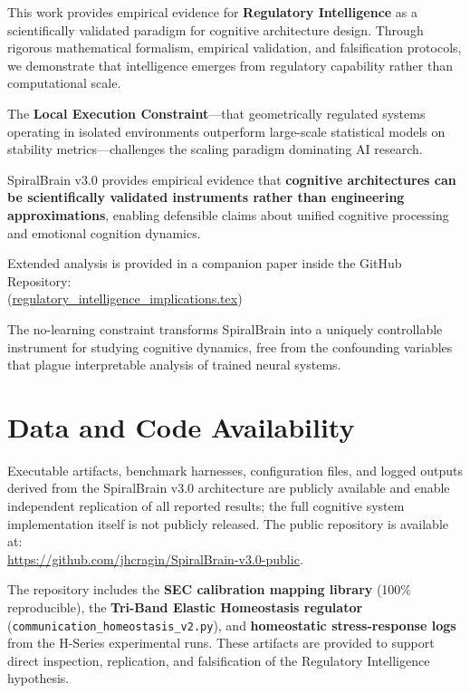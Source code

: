 \documentclass[12pt,a4paper]{report}
\begin{document}
This work provides empirical evidence for \textbf{Regulatory Intelligence} as a scientifically validated paradigm for cognitive architecture design. Through rigorous mathematical formalism, empirical validation, and falsification protocols, we demonstrate that intelligence emerges from regulatory capability rather than computational scale.

The \textbf{Local Execution Constraint}—that geometrically regulated systems operating in isolated environments outperform large-scale statistical models on stability metrics—challenges the scaling paradigm dominating AI research.

SpiralBrain v3.0 provides empirical evidence that \textbf{cognitive architectures can be scientifically validated instruments rather than engineering approximations}, enabling defensible claims about unified cognitive processing and emotional cognition dynamics.

Extended analysis is provided in a companion paper inside the GitHub Repository: \\ 
{\small (\href{https://github.com/jhcragin/SpiralBrain-v3.0-public/blob/main/papers/regulatory_intelligence_implications/regulatory_intelligence_implications.tex}{regulatory\_intelligence\_implications.tex})}


The no-learning constraint transforms SpiralBrain into a uniquely controllable instrument for studying cognitive dynamics, free from the confounding variables that plague interpretable analysis of trained neural systems.

\section{Data and Code Availability}

Executable artifacts, benchmark harnesses, configuration files, and logged outputs derived from the SpiralBrain v3.0 architecture are publicly available and enable independent replication of all reported results; the full cognitive system implementation itself is not publicly released. The public repository is available at: \\
\url{https://github.com/jhcragin/SpiralBrain-v3.0-public}.

The repository includes the \textbf{SEC calibration mapping library} (100\% reproducible), the \textbf{Tri-Band Elastic Homeostasis regulator} (\texttt{communication\_homeostasis\_v2.py}), and \textbf{homeostatic stress-response logs} from the H-Series experimental runs. These artifacts are provided to support direct inspection, replication, and falsification of the Regulatory Intelligence hypothesis.
\end{document}
